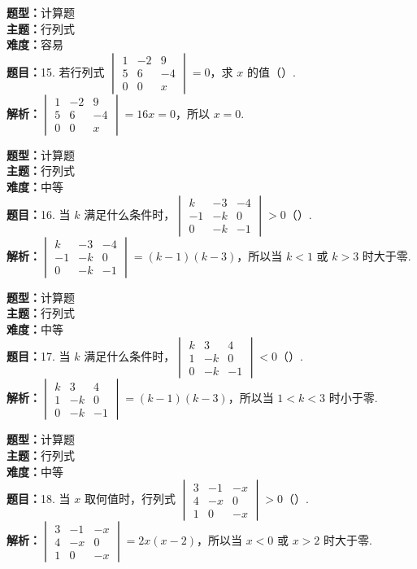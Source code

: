 \documentclass{ctexart}
\newenvironment{question}[5]{%
	\noindent\textbf{题型：}#1\\
	\textbf{主题：}#2\\
	\textbf{难度：}#3\\
	\textbf{题目：}#4\\
	\textbf{解析：}#5\\
	\vspace{1em}
}{}
\begin{document}
	\begin{question} 
		{计算题} 
		{行列式}
		{容易}
		{15. 若行列式 \(\begin{vmatrix} 1 & -2 & 9 \\ 5 & 6 & -4 \\ 0 & 0 & x\end{vmatrix} = 0\)，求 \(x\) 的值（）. }
		{\(\begin{vmatrix} 1 & -2 & 9 \\ 5 & 6 & -4 \\ 0 & 0 & x\end{vmatrix} = 16x = 0\)，所以 \(x = 0\). }
	\end{question}
	
	\begin{question} 
		{计算题} 
		{行列式}
		{中等}
		{16. 当 \(k\) 满足什么条件时，\(\begin{vmatrix} k & -3 & -4 \\ -1 & -k & 0 \\ 0 & -k & -1\end{vmatrix}>0\)（）. }
		{\(\begin{vmatrix} k & -3 & -4 \\ -1 & -k & 0 \\ 0 & -k & -1\end{vmatrix} = (k - 1)(k - 3)\)，所以当 \(k < 1\) 或 \(k > 3\) 时大于零. }
	\end{question}
	
	\begin{question} 
		{计算题} 
		{行列式}
		{中等}
		{17. 当 \(k\) 满足什么条件时，\(\begin{vmatrix} k & 3 & 4 \\ 1 & -k & 0 \\ 0 & -k & -1\end{vmatrix}<0\)（）. }
		{\(\begin{vmatrix} k & 3 & 4 \\ 1 & -k & 0 \\ 0 & -k & -1\end{vmatrix} = (k - 1)(k - 3)\)，所以当 \(1 < k < 3\) 时小于零. }
	\end{question}
	
	\begin{question} 
		{计算题} 
		{行列式}
		{中等}
		{18. 当 \(x\) 取何值时，行列式 \(\begin{vmatrix} 3 & -1 & -x \\ 4 & -x & 0 \\ 1 & 0 & -x\end{vmatrix}>0\)（）. }
		{\(\begin{vmatrix} 3 & -1 & -x \\ 4 & -x & 0 \\ 1 & 0 & -x\end{vmatrix} = 2x(x - 2)\)，所以当 \(x < 0\) 或 \(x > 2\) 时大于零. }
	\end{question}
	
\end{document}
